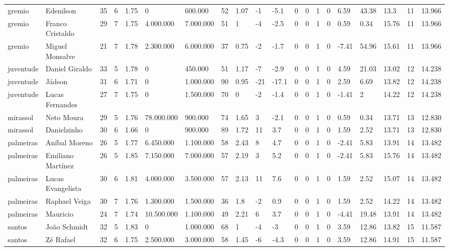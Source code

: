 \begin{longtable}{llllllllllllllllllll}
gremio & Edenilson & 35 & 6 & 1.75 & 0 & 600.000 & 52 & 1.07 & -1 & -5.1 & 0 & 0 & 1 & 0 & 6.59 & 43.38 & 13.3 & 11 & 13.966 \\
gremio & Franco Cristaldo & 29 & 7 & 1.75 & 4.000.000 & 7.000.000 & 51 & 1 & -4 & -2.5 & 0 & 0 & 1 & 0 & 0.59 & 0.34 & 15.76 & 11 & 13.966 \\
gremio & Miguel Monsalve & 21 & 7 & 1.78 & 2.300.000 & 6.000.000 & 37 & 0.75 & -2 & -1.7 & 0 & 0 & 1 & 0 & -7.41 & 54.96 & 15.61 & 11 & 13.966 \\
juventude & Daniel Giraldo & 33 & 5 & 1.78 & 0 & 450.000 & 51 & 1.17 & -7 & -2.9 & 0 & 0 & 1 & 0 & 4.59 & 21.03 & 13.02 & 12 & 14.238 \\
juventude & Jádson & 31 & 6 & 1.71 & 0 & 1.000.000 & 90 & 0.95 & -21 & -17.1 & 0 & 0 & 1 & 0 & 2.59 & 6.69 & 13.82 & 12 & 14.238 \\
juventude & Lucas Fernandes & 27 & 7 & 1.75 & 0 & 1.500.000 & 70 & 0 & -2 & -1.4 & 0 & 0 & 1 & 0 & -1.41 & 2 & 14.22 & 12 & 14.238 \\
mirassol & Neto Moura & 29 & 5 & 1.76 & 78.000.000 & 900.000 & 74 & 1.65 & 3 & -2.1 & 0 & 0 & 1 & 0 & 0.59 & 0.34 & 13.71 & 13 & 12.830 \\
mirassol & Danielzinho & 30 & 6 & 1.66 & 0 & 900.000 & 89 & 1.72 & 11 & 3.7 & 0 & 0 & 1 & 0 & 1.59 & 2.52 & 13.71 & 13 & 12.830 \\
palmeiras & Aníbal Moreno & 26 & 5 & 1.77 & 6.450.000 & 1.100.000 & 58 & 2.43 & 8 & 4.7 & 0 & 0 & 1 & 0 & -2.41 & 5.83 & 13.91 & 14 & 13.482 \\
palmeiras & Emiliano Martínez & 26 & 5 & 1.85 & 7.150.000 & 7.000.000 & 57 & 2.19 & 3 & 5.2 & 0 & 0 & 1 & 0 & -2.41 & 5.83 & 15.76 & 14 & 13.482 \\
palmeiras & Lucas Evangelista & 30 & 6 & 1.81 & 4.000.000 & 3.500.000 & 57 & 2.13 & 11 & 7.6 & 0 & 0 & 1 & 0 & 1.59 & 2.52 & 15.07 & 14 & 13.482 \\
palmeiras & Raphael Veiga & 30 & 7 & 1.76 & 1.300.000 & 1.500.000 & 36 & 1.8 & -2 & 0.9 & 0 & 0 & 1 & 0 & 1.59 & 2.52 & 14.22 & 14 & 13.482 \\
palmeiras & Mauricio & 24 & 7 & 1.74 & 10.500.000 & 1.100.000 & 49 & 2.21 & 6 & 3.7 & 0 & 0 & 1 & 0 & -4.41 & 19.48 & 13.91 & 14 & 13.482 \\
santos & João Schmidt & 32 & 5 & 1.83 & 0 & 1.000.000 & 68 & 1 & -4 & -3 & 0 & 0 & 1 & 0 & 3.59 & 12.86 & 13.82 & 15 & 11.587 \\
santos & Zé Rafael & 32 & 6 & 1.75 & 2.500.000 & 3.000.000 & 58 & 1.45 & -6 & -4.3 & 0 & 0 & 1 & 0 & 3.59 & 12.86 & 14.91 & 15 & 11.587 \\

\end{longtable}
